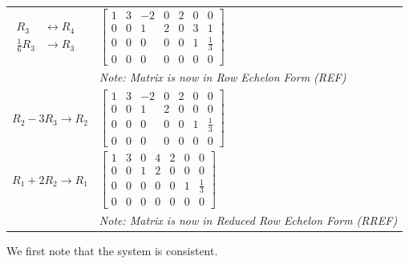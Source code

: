 \documentclass[../linear-algebra.tex]{subfiles}
\begin{document}
\begin{table}[H]
\begin{tabular}{|>{\centering\arraybackslash}m{3.5cm}|>{\centering\arraybackslash}m{10cm}|}
    \rule{0pt}{2.5em} 
    $\begin{aligned}
        R_3 &\leftrightarrow R_4 \\
        \tfrac{1}{6}R_3 &\rightarrow R_3
    \end{aligned}$ 
    & 
    $\left[
    \begin{array}{cccccc|c}
        1 & 3 & -2 & 0 & 2 & 0 & 0 \\
        0 & 0 & 1 & 2 & 0 & 3 & 1 \\
        0 & 0 & 0 & 0 & 0 & 1 & \frac{1}{3} \\
        0 & 0 & 0 & 0 & 0 & 0 & 0
    \end{array}
    \right]$ 
    \\[2.5em] %
    
    & \textit{Note: Matrix is now in Row Echelon Form (REF)} \\[1em] \hline
    
    \rule{0pt}{2.5em} 
    $R_2 - 3R_3 \rightarrow R_2$ 
    & 
    $\left[
    \begin{array}{cccccc|c}
        1 & 3 & -2 & 0 & 2 & 0 & 0 \\
        0 & 0 & 1 & 2 & 0 & 0 & 0 \\
        0 & 0 & 0 & 0 & 0 & 1 & \frac{1}{3} \\
        0 & 0 & 0 & 0 & 0 & 0 & 0
    \end{array}
    \right]$ 
    \\[3em] \hline

    \rule{0pt}{2.5em} 
    $R_1 + 2R_2 \rightarrow R_1$ 
    & 
    $\left[
    \begin{array}{cccccc|c}
        1 & 3 & 0 & 4 & 2 & 0 & 0 \\
        0 & 0 & 1 & 2 & 0 & 0 & 0 \\
        0 & 0 & 0 & 0 & 0 & 1 & \frac{1}{3} \\
        0 & 0 & 0 & 0 & 0 & 0 & 0
    \end{array}
    \right]$ 
    \\[2.5em] %
    
    & \textit{Note: Matrix is now in Reduced Row Echelon Form (RREF)} \\[1em] \hline
\end{tabular}
\end{table}
\noindent We first note that the system is consistent.
\end{document}
